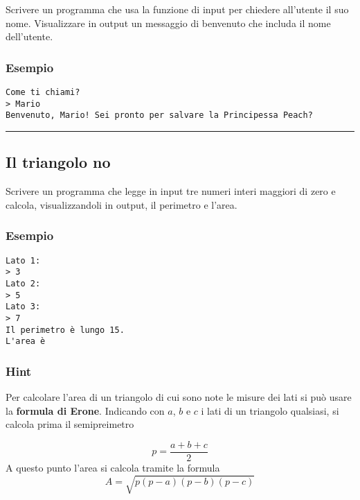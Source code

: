 \documentclass[
]{book}
\begin{document}
Scrivere un programma che usa la funzione di input per chiedere all'utente il suo nome. Visualizzare in output un messaggio di benvenuto che includa il nome dell'utente.

\hypertarget{esempio}{%
\subsubsection*{Esempio}\label{esempio}}

\begin{verbatim}
Come ti chiami?
> Mario
Benvenuto, Mario! Sei pronto per salvare la Principessa Peach?
\end{verbatim}

\begin{center}\rule{0.5\linewidth}{0.5pt}\end{center}

\hypertarget{il-triangolo-no}{%
\subsection{Il triangolo no}\label{il-triangolo-no}}

Scrivere un programma che legge in input tre numeri interi maggiori di zero e calcola, visualizzandoli in output, il perimetro e l'area.

\hypertarget{esempio-1}{%
\subsubsection*{Esempio}\label{esempio-1}}

\begin{verbatim}
Lato 1:
> 3
Lato 2:
> 5
Lato 3:
> 7
Il perimetro è lungo 15.
L'area è 
\end{verbatim}

\hypertarget{hint}{%
\subsubsection*{Hint}\label{hint}}

Per calcolare l'area di un triangolo di cui sono note le misure dei lati si può usare la \textbf{formula di Erone}. Indicando con \(a\), \(b\) e \(c\) i lati di un triangolo qualsiasi, si calcola prima il semipreimetro

\[
p = \frac{a+b+c}{2}
\]
A questo punto l'area si calcola tramite la formula
\[
A = \sqrt{p(p-a)(p-b)(p-c)}
\]
\end{document}

